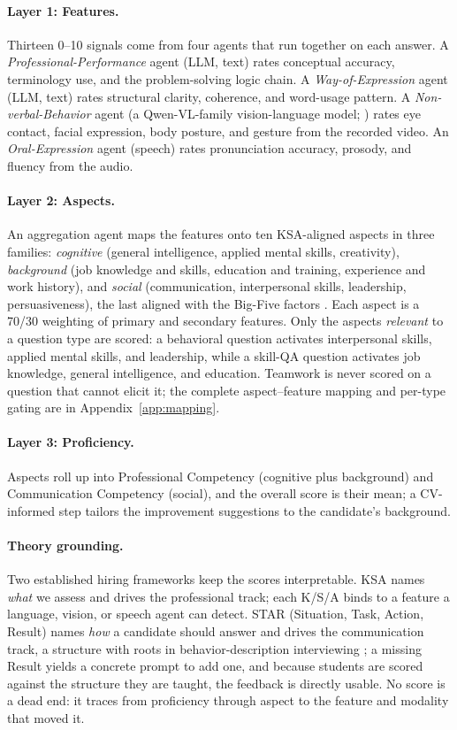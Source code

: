 \documentclass[11pt]{article}
\begin{document}
\paragraph{Layer 1: Features.} Thirteen 0--10 signals come from four agents that run together on each answer. A \emph{Professional-Performance} agent (LLM, text) rates conceptual accuracy, terminology use, and the problem-solving logic chain. A \emph{Way-of-Expression} agent (LLM, text) rates structural clarity, coherence, and word-usage pattern. A \emph{Non-verbal-Behavior} agent (a Qwen-VL-family vision-language model; \citealp{bai2023qwenvl}) rates eye contact, facial expression, body posture, and gesture from the recorded video. An \emph{Oral-Expression} agent (speech) rates pronunciation accuracy, prosody, and fluency from the audio.

\paragraph{Layer 2: Aspects.} An aggregation agent maps the features onto ten KSA-aligned aspects in three families: \emph{cognitive} (general intelligence, applied mental skills, creativity), \emph{background} (job knowledge and skills, education and training, experience and work history), and \emph{social} (communication, interpersonal skills, leadership, persuasiveness), the last aligned with the Big-Five factors \citep{mccrae1987validation}. Each aspect is a 70/30 weighting of primary and secondary features. Only the aspects \emph{relevant} to a question type are scored: a behavioral question activates interpersonal skills, applied mental skills, and leadership, while a skill-QA question activates job knowledge, general intelligence, and education. Teamwork is never scored on a question that cannot elicit it; the complete aspect--feature mapping and per-type gating are in Appendix~\ref{app:mapping}.

\paragraph{Layer 3: Proficiency.} Aspects roll up into Professional Competency (cognitive plus background) and Communication Competency (social), and the overall score is their mean; a CV-informed step tailors the improvement suggestions to the candidate's background.

\paragraph{Theory grounding.} Two established hiring frameworks keep the scores interpretable. KSA names \emph{what} we assess and drives the professional track; each K/S/A binds to a feature a language, vision, or speech agent can detect. STAR (Situation, Task, Action, Result) names \emph{how} a candidate should answer and drives the communication track, a structure with roots in behavior-description interviewing \citep{janz1982behavior}; a missing Result yields a concrete prompt to add one, and because students are scored against the structure they are taught, the feedback is directly usable. No score is a dead end: it traces from proficiency through aspect to the feature and modality that moved it.
\end{document}
